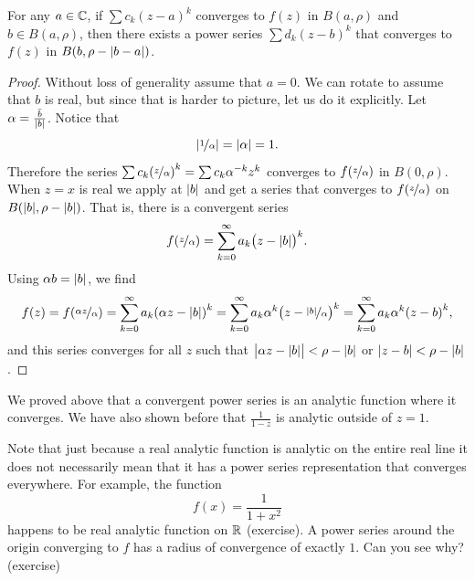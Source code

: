 \begin{cor} \label{cor:powerseranalytic}
For any $a \in {\mathbb{C}}$,
if $\sum c_k {(z-a)}^k$ converges to $f(z)$ in $B(a,\rho)$ and $b \in
B(a,\rho)$,
then there exists a power series
$\sum d_k {(z-b)}^k$ that converges to $f(z)$ in $B(b,\rho-\lvert {b-a} \rvert)$.
\end{cor}

\begin{proof}
Without loss of generality assume that $a=0$.  We can rotate to assume that $b$ is real, but
since that is harder to picture, let us do it explicitly.
Let $\alpha = \frac{\bar{b}}{\lvert {b} \rvert}$.
Notice that
\begin{equation*}
\left\lvert {\nicefrac{1}{\alpha}} \right\rvert = \lvert {\alpha} \rvert
= 1 .
\end{equation*}
Therefore the series
$\sum c_k {(\nicefrac{z}{\alpha})}^k = 
\sum c_k \alpha^{-k} {z}^k$
converges to $f(\nicefrac{z}{\alpha})$ in $B(0,\rho)$.
When $z=x$ is real
we apply  at $\lvert {b} \rvert$ and get
a series that converges
to $f(\nicefrac{z}{\alpha})$ on $B(\lvert {b} \rvert,\rho-\lvert {b} \rvert)$.
That is, there is a convergent series
\begin{equation*}
f(\nicefrac{z}{\alpha}) =
\sum_{k=0}^\infty a_k {\bigl(z - \lvert {b} \rvert\bigr)}^k .
\end{equation*}
Using $\alpha b = \lvert {b} \rvert$, we find
\begin{equation*}
f(z) = f(\nicefrac{\alpha z}{\alpha}) =
\sum_{k=0}^\infty a_k {(\alpha z - \lvert {b} \rvert)}^k 
=
\sum_{k=0}^\infty a_k\alpha^k {\bigl(z - \nicefrac{\lvert {b} \rvert}{\alpha}\bigr)}^k
=
\sum_{k=0}^\infty a_k\alpha^k {(z - b)}^k ,
\end{equation*}
and this series converges for all $z$ such that
$\bigl\lvert \alpha z-\lvert {b} \rvert\bigr\rvert < \rho-\lvert {b} \rvert$
or $\lvert {z - b} \rvert < \rho-\lvert {b} \rvert$.
\end{proof}

We proved above that a convergent power series is an
analytic function where it converges.  We have also shown before that
$\frac{1}{1-z}$ is analytic outside of $z=1$.

Note that just because a real analytic function is analytic on the
entire real line it does not necessarily mean that it has a power series
representation that converges everywhere.  For example, the function
\begin{equation*}
f(x) = \frac{1}{1+x^2}
\end{equation*}
happens to be real analytic function on ${\mathbb{R}}$ (exercise).  A power
series around the origin converging to $f$
has a radius of convergence of exactly $1$.
Can you see why? (exercise)

